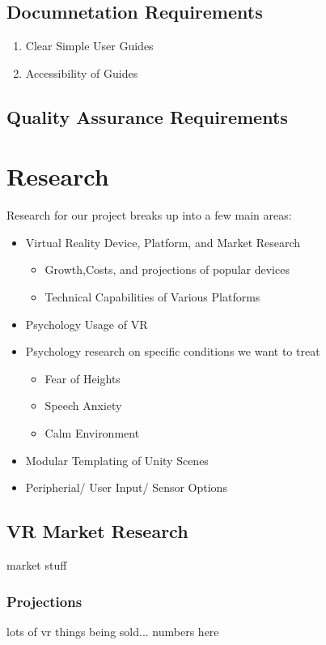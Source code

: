 \documentclass[a4paper,10pt]{article}
\begin{document}
	\subsection{Documnetation Requirements}
	\begin{enumerate}
	 \item Clear Simple User Guides
	 \item Accessibility of Guides
	\end{enumerate}
	\subsection{Quality Assurance Requirements}

	
	
\pagebreak
\section{Research}
Research for our project breaks up into a few main areas:
\begin{itemize}
\item Virtual Reality Device, Platform, and Market Research
	\begin{itemize}
	\item Growth,Costs, and projections of popular devices
	\item Technical Capabilities of Various Platforms
	\end{itemize}
\item Psychology Usage of VR
\item Psychology research on specific conditions we want to treat
	\begin{itemize}
	\item Fear of Heights
	\item Speech Anxiety
	\item Calm Environment
	\end{itemize}
\item Modular Templating of Unity Scenes
\item Peripherial/ User Input/ Sensor Options
\end{itemize}

\subsection{VR Market Research}
market stuff
\pagebreak
\subsubsection{Projections}
lots of vr things being sold... numbers here
\pagebreak
\end{document}
